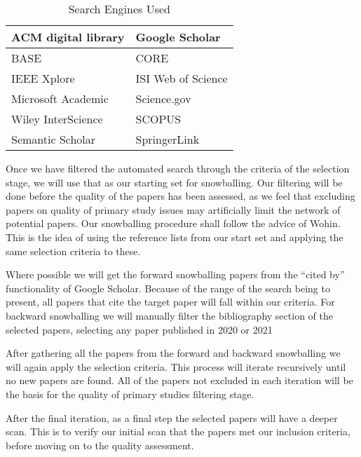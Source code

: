 \begin{table}[H]
    \begin{center}         
        \begin{tabular}{|l||l|}
            \hline
            ACM digital library       & Google Scholar       \\
            \hline
            BASE                      & CORE                 \\
            \hline  
            IEEE Xplore               & ISI Web of Science   \\
            \hline  
            Microsoft Academic        & Science.gov          \\
            \hline  
            Wiley InterScience        & SCOPUS               \\
            \hline  
            Semantic Scholar          & SpringerLink         \\
            \hline  
        \end{tabular}
    \end{center}
    \caption{Search Engines Used}
    \label{table:searchEngines}
\end{table}

Once we have filtered the automated search through the criteria of the selection stage, we will use that as our starting set for snowballing.
Our filtering will be done before the quality of the papers has been assessed, as we feel that excluding papers on quality of primary study issues may artificially limit the network of potential papers.
Our snowballing procedure shall follow the advice of Wohin\cite{Wohlin_2014}.
This is the idea of using the reference lists from our start set and applying the same selection criteria to these.

Where possible we will get the forward snowballing papers from the ``cited by'' functionality of Google Scholar.
Because of the range of the search being to present, all papers that cite the target paper will fall within our criteria.
For backward snowballing we will manually filter the bibliography section of the selected papers, selecting any paper published in 2020 or 2021

After gathering all the papers from the forward and backward snowballing we will again apply the selection criteria.
This process will iterate recursively until no new papers are found.
All of the papers not excluded in each iteration will be the basis for the quality of primary studies filtering stage.

After the final iteration, as a final step the selected papers will have a deeper scan.
This is to verify our initial scan that the papers met our inclusion criteria, before moving on to the quality assessment.


